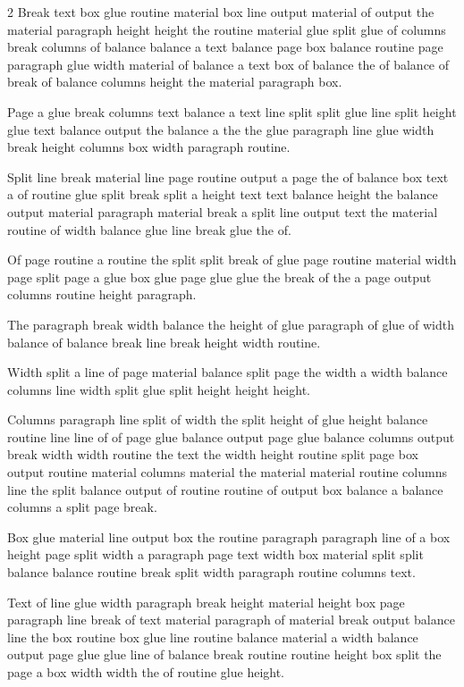\documentclass{article}
\begin{document}
\begin{multicols}{2}
Break text box glue routine material box line output material of output the material paragraph height height the routine material glue split glue of columns break columns of balance balance a text balance page box balance routine page paragraph glue width material of balance a text box of balance the of balance of break of balance columns height the material paragraph box.

Page a glue break columns text balance a text line split split glue line split height glue text balance output the balance a the the glue paragraph line glue width break height columns box width paragraph routine.

Split line break material line page routine output a page the of balance box text a of routine glue split break split a height text text balance height the balance output material paragraph material break a split line output text the material routine of width balance glue line break glue the of.

Of page routine a routine the split split break of glue page routine material width page split page a glue box glue page glue glue the break of the a page output columns routine height paragraph.

The paragraph break width balance the height of glue paragraph of glue of width balance of balance break line break height width routine.

Width split a line of page material balance split page the width a width balance columns line width split glue split height height height.

Columns paragraph line split of width the split height of glue height balance routine line line of of page glue balance output page glue balance columns output break width width routine the text the width height routine split page box output routine material columns material the material material routine columns line the split balance output of routine routine of output box balance a balance columns a split page break.

Box glue material line output box the routine paragraph paragraph line of a box height page split width a paragraph page text width box material split split balance balance routine break split width paragraph routine columns text.

Text of line glue width paragraph break height material height box page paragraph line break of text material paragraph of material break output balance line the box routine box glue line routine balance material a width balance output page glue glue line of balance break routine routine height box split the page a box width width the of routine glue height.


\end{multicols}
\end{document}
